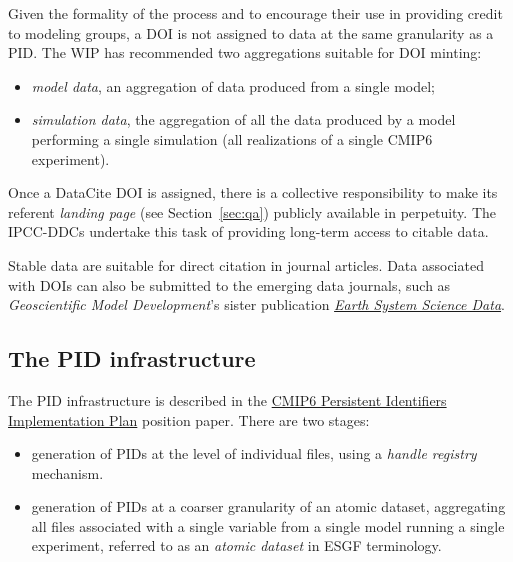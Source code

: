 \documentclass[gmd,manuscript]{copernicus}
\newcommand{\secref}[1] {\mbox{Section  \ref{sec:#1}}}
\begin{document}
\begin{itemize}
  Given the formality of the process and to encourage their use in
  providing credit to modeling groups, a DOI is not assigned to data at
  the same granularity as a PID. The WIP has recommended two
  aggregations suitable for DOI minting:

  \begin{itemize}
  \item \emph{model data}, an aggregation of data produced from a
    single model;
  \item \emph{simulation data}, the aggregation of all the data
    produced by a model performing a single simulation (all
    realizations of a single CMIP6 experiment).
  \end{itemize}

  Once a DataCite DOI is assigned, there is a collective
  responsibility to make its referent \emph{landing page} (see
  \secref{qa}) publicly available in perpetuity. The IPCC-DDCs
  undertake this task of providing long-term access to citable data.

  Stable data are suitable for direct citation in journal articles.
  Data associated with DOIs can also be submitted to the emerging data
  journals, such as \emph{Geoscientific Model Development}'s sister
  publication
  \href{https://www.earth-system-science-data.net/}{\emph{Earth System
      Science Data}}.
\end{itemize}

\subsection{The PID infrastructure}
\label{sec:pid}

The PID infrastructure is described in the
\href{https://goo.gl/miUREw}{CMIP6 Persistent Identifiers
  Implementation Plan} position paper. There are two stages:

\begin{itemize}
\item generation of PIDs at the level of individual files, using a
  \emph{handle registry} mechanism.
\item generation of PIDs at a coarser granularity of an atomic
  dataset, aggregating all files associated with a single variable
  from a single model running a single experiment, referred to as an
  \emph{atomic dataset} in ESGF terminology.
\end{itemize}
\end{document}
